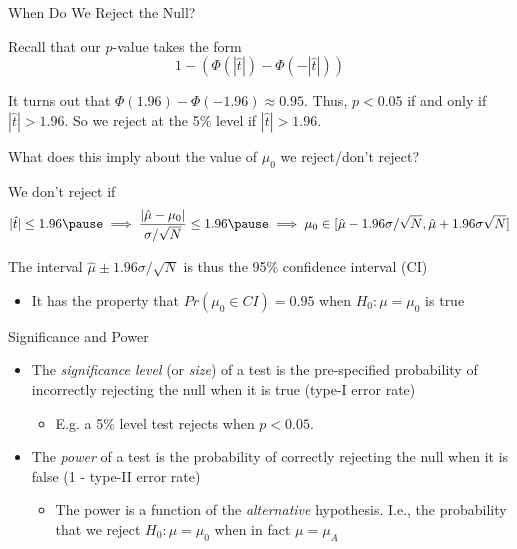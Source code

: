\documentclass[11pt,english,handout]{beamer}
\newenvironment{wideitemize}{\itemize\addtolength{\itemsep}{10pt}}{\enditemize}
\begin{document}
\begin{frame}{When Do We Reject the Null?}

\begin{wideitemize}
	\item 
	Recall that our $p$-value takes the form
	$$1 - \left(  \Phi(|\hat{t}|) - \Phi( -|\hat{t}| )  \right) $$
	
	\item
	It turns out that $\Phi(1.96) - \Phi(-1.96) \approx 0.95$. Thus, $p < 0.05$ if and only if $|\hat{t}| > 1.96$. So we reject at the 5\% level if $|\hat{t}| > 1.96$. 
	
	\pause
	\item
	What does this imply about the value of $\mu_0$ we reject/don't reject?
	
	\pause
	\item
	We don't reject if 	
	$$ |\hat{t}| \leq 1.96 \pause \implies \dfrac{ |\hat\mu - \mu_0| }{ \sigma / \sqrt{N} } \leq 1.96 \pause \implies \mu_0 \in  [\hat\mu - 1.96 \sigma / \sqrt{N} , \hat\mu + 1.96 \sigma \sqrt{N}]$$
\vspace{-0.5cm}
	\pause
	\item
	The interval $\hat\mu \pm 1.96 \sigma / \sqrt{N}$ is thus the 95\% confidence interval (CI)
	\smallskip

		\begin{itemize}
			\item 
			It has the property that $Pr( \mu_0 \in CI ) = 0.95$ when $H_0: \mu = \mu_0$ is true
		\end{itemize}
	
\end{wideitemize}
	
\end{frame}



\begin{frame}{Significance and Power}
	
	\begin{itemize}
		\item The \emph{significance level} (or \emph{size}) of a test is the pre-specified probability of incorrectly rejecting the null when it is true (type-I error rate)
		 \pause
		 \begin{itemize}
		 	\item 
		 	E.g. a 5\% level test rejects when $p<0.05$.
		 \end{itemize}
		\pause
		\bigskip

		\item The \emph{power} of a test is the probability of correctly rejecting the null when it is false (1 - type-II error rate)
		
			\begin{itemize}
				\item 
				The power is a function of the \textit{alternative} hypothesis. I.e., the probability that we reject $H_0:\mu=\mu_0$ when in fact $\mu = \mu_A$ 
			\end{itemize}
	\end{itemize}

\end{frame}
\end{document}
